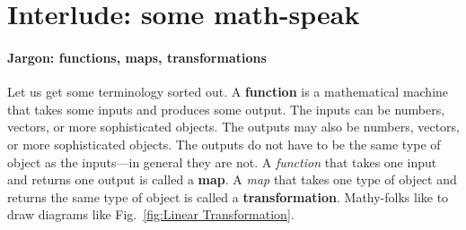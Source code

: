 \section{Interlude: some math-speak}

\paragraph{Jargon: functions, maps, transformations} Let us get some terminology sorted out.
A \textbf{function} is a mathematical machine that takes some inputs and produces some output. The inputs can be numbers, vectors, or more sophisticated objects. The outputs may also be numbers, vectors, or more sophisticated objects. The outputs do not have to be the same type of object as the inputs---in general they are not.
% 
A \emph{function} that takes one input and returns one output is called a \textbf{map}. 
% 
A \emph{map} that takes one type of object and returns the same type of object is called a \textbf{transformation}. Mathy-folks like to draw diagrams like Fig.~\ref{fig:Linear Transformation}.

